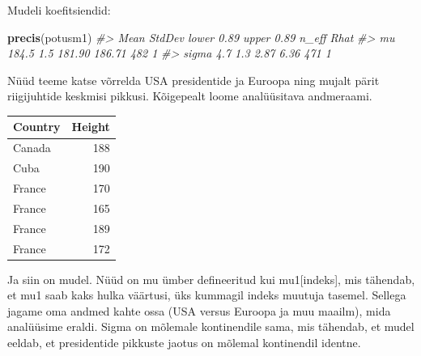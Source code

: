 \documentclass[]{book}
\newenvironment{Shaded}{\begin{snugshade}}{\end{snugshade}}
\newcommand{\CommentTok}[1]{\textcolor[rgb]{0.56,0.35,0.01}{\textit{#1}}}
\newcommand{\DataTypeTok}[1]{\textcolor[rgb]{0.13,0.29,0.53}{#1}}
\newcommand{\KeywordTok}[1]{\textcolor[rgb]{0.13,0.29,0.53}{\textbf{#1}}}
\newcommand{\NormalTok}[1]{#1}
\newcommand{\OperatorTok}[1]{\textcolor[rgb]{0.81,0.36,0.00}{\textbf{#1}}}
\newcommand{\StringTok}[1]{\textcolor[rgb]{0.31,0.60,0.02}{#1}}
\begin{document}
Mudeli koefitsiendid:

\begin{Shaded}
\begin{Highlighting}[]
\KeywordTok{precis}\NormalTok{(potusm1)}
\CommentTok{#>        Mean StdDev lower 0.89 upper 0.89 n_eff Rhat}
\CommentTok{#> mu    184.5    1.5     181.90     186.71   482    1}
\CommentTok{#> sigma   4.7    1.3       2.87       6.36   471    1}
\end{Highlighting}
\end{Shaded}

Nüüd teeme katse võrrelda USA presidentide ja Euroopa ning mujalt pärit riigijuhtide keskmisi pikkusi.
Kõigepealt loome analüüsitava andmeraami.

\begin{Shaded}
\end{Shaded}

\begin{tabular}{l|r}
\hline
Country & Height\\
\hline
Canada & 188\\
\hline
Cuba & 190\\
\hline
France & 170\\
\hline
France & 165\\
\hline
France & 189\\
\hline
France & 172\\
\hline
\end{tabular}

Ja siin on mudel.
Nüüd on mu ümber defineeritud kui mu1{[}indeks{]}, mis tähendab, et mu1 saab kaks hulka väärtusi, üks kummagil indeks muutuja tasemel.
Sellega jagame oma andmed kahte ossa (USA versus Euroopa ja muu maailm), mida analüüsime eraldi.
Sigma on mõlemale kontinendile sama, mis tähendab, et mudel eeldab, et presidentide pikkuste jaotus on mõlemal kontinendil identne.

\begin{Shaded}
\end{Shaded}
\end{document}
